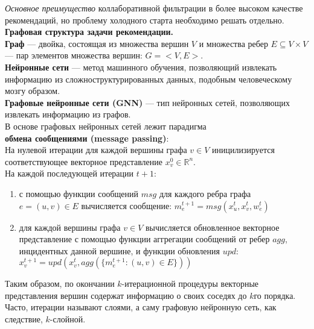 \documentclass[a4paper,14pt,oneside]{mipt-thesis-ms}
\begin{document}
{\it Основное преимущество} коллаборативной фильтрации в более высоком качестве рекомендаций, но проблему холодного старта необходимо решать отдельно.
\\

{\bf Графовая структура задачи рекомендации.}\\
{\bf Граф} --- двойка, состоящая из множества вершин $V$ и множества ребер $E \subseteq V \times V$ --- пар элементов множества вершин: \:$G = <V, E>$.\\
{\bf Нейронные сети} --- метод машинного обучения, позволяющий извлекать информацию из сложноструктурированных данных, подобным человеческому мозгу образом.\\
{\bf Графовые нейронные сети (GNN)} --- тип нейронных сетей, позволяющих извлекать информацию из графов.\cite{gao01} \\

В основе графовых нейронных сетей лежит парадигма\\{\bf обмена сообщениями (message passing)\cite{gilmer01}}:
\\На нулевой итерации для каждой вершины графа $v \in V$ иницилизируется соответствующее векторное представление $x_v^0 \in \mathbb{R}^n$.
\\На каждой последующей итерации $t+1$:
\begin{enumerate}
    \item с помощью функции сообщений $msg$ для каждого ребра графа $e = (u, v) \in E$ вычисляется сообщение: $m_e^{t+1} = msg(x_u^t, x_v^t, w_e^t)$
    \item для каждой вершины графа $v \in V$ вычисляется обновленное векторное представление с помощью функции аггрегации сообщений от ребер $agg$, инцидентных данной вершине, и функции обновления $upd$: $x_v^{t+1} = upd(x_v^t, agg(\{m_e^{t+1}: (u, v) \in E\}))$
\end{enumerate}

Таким образом, по окончании $k$-итерационной процедуры векторные представления вершин содержат информацию о своих соседях до $k$го порядка. Часто, итерации называют слоями, а саму графовую нейронную сеть, как следствие, $k$-слойной.
\\
\end{document}
